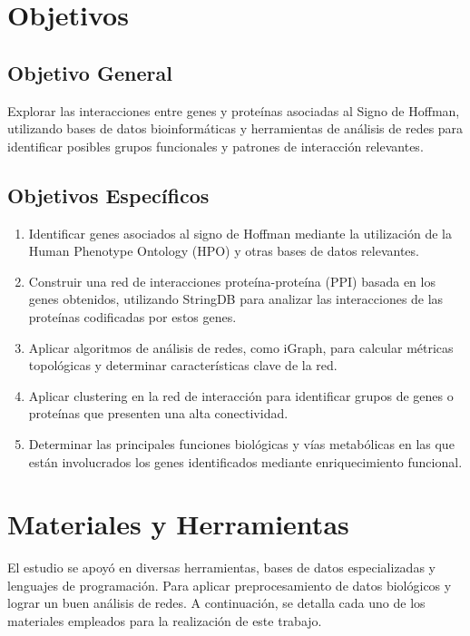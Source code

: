 \section{Objetivos}
\subsection{Objetivo General}

Explorar las interacciones entre genes y proteínas asociadas al Signo de Hoffman, utilizando bases de datos bioinformáticas y herramientas de análisis de redes para identificar posibles grupos funcionales y patrones de interacción relevantes.

\subsection{Objetivos Específicos}
\begin{enumerate}
	\item Identificar genes asociados al signo de Hoffman mediante la utilización de la Human Phenotype Ontology (HPO) y otras bases de datos relevantes.
	\item Construir una red de interacciones proteína-proteína (PPI) basada en los genes obtenidos, utilizando StringDB para analizar las interacciones de las proteínas codificadas por estos genes.
	\item Aplicar algoritmos de análisis de redes, como iGraph, para calcular métricas topológicas y determinar características clave de la red.
	\item Aplicar clustering en la red de interacción para identificar grupos de genes o proteínas que presenten una alta conectividad.
	\item Determinar las principales funciones biológicas y vías metabólicas en las que están involucrados los genes identificados mediante enriquecimiento funcional.
\end{enumerate}

\section{Materiales y Herramientas}

El estudio se apoyó en diversas herramientas, bases de datos especializadas y lenguajes de programación. Para aplicar preprocesamiento de datos biológicos y lograr un buen análisis de redes. A continuación, se detalla cada uno de los materiales empleados para la realización de este trabajo.

